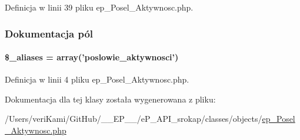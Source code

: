 Definicja w linii 39 pliku ep\-\_\-\-Posel\-\_\-\-Aktywnosc.\-php.



\subsubsection{Dokumentacja pól}
\hypertarget{classep___posel___aktywnosc_ab4e31d75f0bc5d512456911e5d01366b}{
\paragraph[{\$\-\_\-aliases}]{\setlength{\rightskip}{0pt plus 5cm}\$\-\_\-aliases = array('poslowie\-\_\-aktywnosci')}}\label{classep___posel___aktywnosc_ab4e31d75f0bc5d512456911e5d01366b}


Definicja w linii 4 pliku ep\-\_\-\-Posel\-\_\-\-Aktywnosc.\-php.



Dokumentacja dla tej klasy została wygenerowana z pliku\-:\begin{DoxyCompactItemize}
\item 
/\-Users/veri\-Kami/\-Git\-Hub/\-\_\-\-\_\-\-E\-P\-\_\-\-\_\-/e\-P\-\_\-\-A\-P\-I\-\_\-srokap/classes/objects/\hyperlink{ep___posel___aktywnosc_8php}{ep\-\_\-\-Posel\-\_\-\-Aktywnosc.\-php}\end{DoxyCompactItemize}

